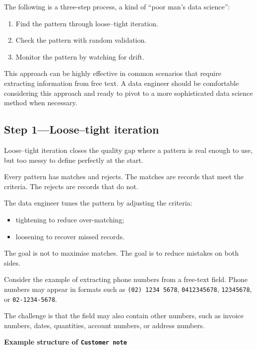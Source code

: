 \documentclass[10pt,openany,10pt]{book}
\providecommand{\tightlist}{%
  \setlength{\itemsep}{0pt}\setlength{\parskip}{0pt}}
\begin{document}
The following is a three-step process, a kind of ``poor man's data
science'':

\begin{enumerate}
\def\labelenumi{\arabic{enumi}.}
\tightlist
\item
  Find the pattern through loose--tight iteration.
\item
  Check the pattern with random validation.
\item
  Monitor the pattern by watching for drift.
\end{enumerate}

This approach can be highly effective in common scenarios that require
extracting information from free text. A data engineer should be
comfortable considering this approach and ready to pivot to a more
sophisticated data science method when necessary.

\subsection{Step 1---Loose--tight
iteration}\label{step-1loosetight-iteration}

Loose--tight iteration closes the quality gap where a pattern is real
enough to use, but too messy to define perfectly at the start.

Every pattern has matches and rejects. The matches are records that meet
the criteria. The rejects are records that do not.

The data engineer tunes the pattern by adjusting the criteria:

\begin{itemize}
\tightlist
\item
  tightening to reduce over-matching;
\item
  loosening to recover missed records.
\end{itemize}

The goal is not to maximise matches. The goal is to reduce mistakes on
both sides.

Consider the example of extracting phone numbers from a free-text field.
Phone numbers may appear in formats such as \texttt{(02)\ 1234\ 5678},
\texttt{0412345678}, \texttt{12345678}, or \texttt{02-1234-5678}.

The challenge is that the field may also contain other numbers, such as
invoice numbers, dates, quantities, account numbers, or address numbers.

\textbf{Example structure of
\texttt{\textquotesingle{}Customer\ note\textquotesingle{}}}
\end{document}

